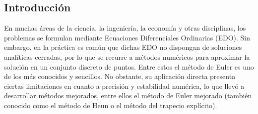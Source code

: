 \documentclass[12pt,a4paper]{article}
\begin{document}
    \subsection{Introducción}
    En muchas áreas de la ciencia, la ingeniería, la economía y otras disciplinas, los problemas se formulan mediante Ecuaciones Diferenciales Ordinarias (EDO). Sin embargo, en la práctica es común que dichas EDO no dispongan de soluciones analíticas cerradas, por lo que se recurre a métodos numéricos para aproximar la solución en un conjunto discreto de puntos.  
    Entre estos el método de Euler es uno de los más conocidos y sencillos.
    No obstante, su aplicación directa presenta ciertas limitaciones en cuanto a precisión y estabilidad numérica, lo que llevó a desarrollar métodos mejorados, entre ellos el método de Euler mejorado (también conocido como el método de Heun o el método del trapecio explícito).
\end{document}
